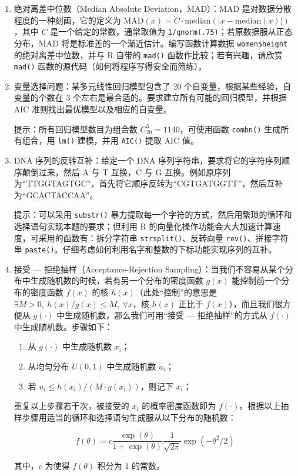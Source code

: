 \documentclass[
  b5paper,
  UTF8,twoside]{book}
\begin{document}
\begin{enumerate}
\def\labelenumi{\arabic{enumi}.}
\item
  绝对离差中位数（Median Absolute Deviation，MAD）：MAD 是对数据分散程度的一种刻画，它的定义为 \(\text{MAD}(x)=C\cdot\text{median}(|x-\text{median}(x)|)\)，其中 \(C\) 是一个给定的常数，通常取值为 \texttt{1/qnorm(.75)}；若原数据服从正态分布，MAD 将是标准差的一个渐近估计。编写函数计算数据 \texttt{women\$height} 的绝对离差中位数，并与 R 自带的 \texttt{mad()} 函数作比较；若有兴趣，请欣赏 \texttt{mad()} 函数的源代码（如何将程序写得安全而简练）。
\item
  变量选择问题：某多元线性回归模型包含了 20 个自变量，根据某些经验，自变量的个数在 3 个左右是最合适的。要求建立所有可能的回归模型，并根据 AIC 准则找出最优模型以及相应的自变量。

  提示：所有回归模型数目为组合数 \(C_{20}^{3}=1140\)，可使用函数 \texttt{combn()} 生成所有组合，用 \texttt{lm()} 建模，并用 \texttt{AIC()} 提取 AIC 值。
\item
  DNA 序列的反转互补：给定一个 DNA 序列字符串，要求将它的字符序列顺序颠倒过来，然后 A 与 T 互换，C 与 G 互换。例如原序列为``TTGGTAGTGC''，首先将它顺序反转为``CGTGATGGTT''，然后互补为``GCACTACCAA''。

  提示：可以采用 \texttt{substr()} 暴力提取每一个字符的方式，然后用繁琐的循环和选择语句实现本题的要求；但利用 R 的向量化操作功能会大大加速计算速度，可采用的函数有：拆分字符串 \texttt{strsplit()}、反转向量 \texttt{rev()}、拼接字符串 \texttt{paste()}。仔细考虑如何利用名字和整数的下标功能实现序列的互补。
\item
  接受 --- 拒绝抽样（Acceptance-Rejection Sampling）：当我们不容易从某个分布中生成随机数的时候，若有另一个分布的密度函数 \(g(x)\) 能控制前一个分布的密度函数 \(f(x)\) 的核 \(h(x)\)（此处``控制''的意思是 \(\exists M>0,\ h(x)/g(x)\leq M,\ \forall x\)，核 \(h(x)\) 正比于 \(f(x)\)），而且我们很方便从 \(g(\cdot)\) 中生成随机数，那么我们可用``接受 --- 拒绝抽样''的方式从 \(f(\cdot)\) 中生成随机数。步骤如下：

  \begin{enumerate}
  \def\labelenumii{(\alph{enumii})}
  \item
    从 \(g(\cdot)\) 中生成随机数 \(x_{i}\)；
  \item
    从均匀分布 \(U(0,1)\) 中生成随机数 \(u_{i}\)；
  \item
    若 \(u_{i}\leq h(x_{i})/(M\cdot g(x_{i}))\)，则记下 \(x_{i}\)；
  \end{enumerate}

  重复以上步骤若干次，被接受的 \(x_{i}\) 的概率密度函数即为 \(f(\cdot)\)。根据以上抽样步骤用适当的循环和选择语句生成服从以下分布的随机数：

  \[f(\theta)=c\frac{\exp(\theta)}{1+\exp(\theta)}\frac{1}{\sqrt{2\pi}}\exp(-\theta^{2}/2)\]

  其中，\(c\) 为使得 \(f(\theta)\) 积分为 1 的常数。
\end{enumerate}
\end{document}
